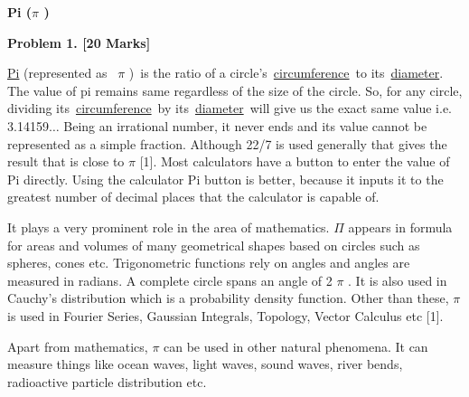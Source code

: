 \documentclass[12pt]{article}
\begin{document}
\begin{Center}
{\fontsize{14pt}{16.8pt}\selectfont \textbf{Pi ($ \pi $ )}\par}
\end{Center}\par

\begin{justify}
{\fontsize{14pt}{16.8pt}\selectfont \textbf{Problem 1. [20 Marks]}\par}
\end{justify}\par

\begin{justify}
\href{https://www.wonderopolis.org/wonder/what-is-pi}{Pi} (represented as  $ \pi $ ) is the ratio of a circle's \href{https://www.wonderopolis.org/wonder/what-is-pi}{circumference} to its \href{https://www.wonderopolis.org/wonder/what-is-pi}{diameter}. The value of pi remains same regardless of the size of the circle. So, for any circle, dividing its \href{https://www.wonderopolis.org/wonder/what-is-pi}{circumference} by its \href{https://www.wonderopolis.org/wonder/what-is-pi}{diameter} will give us the exact same value i.e. 3.14159$ \ldots $  Being an irrational number, it never ends and its value cannot be represented as a simple fraction. Although 22/7 is used generally that gives the result that is close to $ \pi $  [1].  Most calculators have a button to enter the value of Pi directly. Using the calculator Pi button is better, because it inputs it to the greatest number of decimal places that the calculator is capable of.
\end{justify}\par

\begin{justify}
It plays a very prominent role in the area of mathematics. $ \Pi $  appears in formula for areas and volumes of many geometrical shapes based on circles such as spheres, cones etc. Trigonometric functions rely on angles and angles are measured in radians. A complete circle spans an angle of 2 $ \pi $ . It is also used in Cauchy’s distribution which is a probability density function. Other than these, $ \pi $  is used in Fourier Series, Gaussian Integrals, Topology, Vector Calculus etc [1].
\end{justify}\par

\begin{justify}
Apart from mathematics, $ \pi $  can be used in other natural phenomena. It can measure things like ocean waves, light waves, sound waves, river bends, radioactive particle distribution etc.
\end{justify}\par
\end{document}
